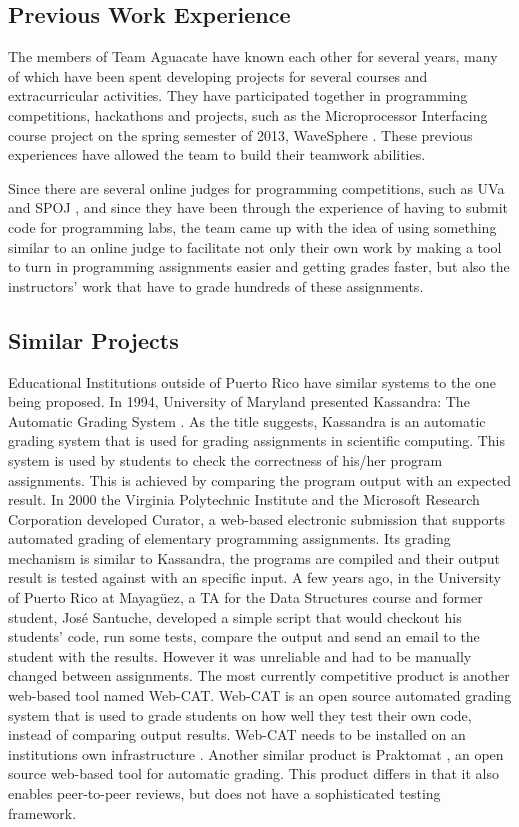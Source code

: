 
\subsection{Previous Work Experience}

The members of Team Aguacate have known each other for several years, many of
which have been spent developing projects for several courses and
extracurricular activities. They have participated together in programming
competitions, hackathons and projects, such as the Microprocessor Interfacing
course project on the spring semester of 2013, WaveSphere \cite{Micro2}. These
previous experiences have allowed the team to build their teamwork abilities.

Since there are several online judges for programming competitions, such as UVa
\cite{UVA} and SPOJ \cite{SPOJ}, and since they have been through the experience
of having to submit code for programming labs, the team came up with the idea of
using something similar to an online judge to facilitate not only their own work
by making a tool to turn in programming assignments easier and getting grades
faster, but also the instructors' work that have to grade hundreds of these
assignments.

\subsection{Similar Projects}

Educational Institutions outside of Puerto Rico have similar systems to the one
being proposed. In 1994, University of Maryland presented Kassandra: The
Automatic Grading System \cite{Matt1994}. As the title suggests, Kassandra is an
automatic grading system that is used for grading assignments in scientific
computing. This system is used by students to check the correctness of his/her
program assignments. This is achieved by comparing the program output with an
expected result. In 2000 the Virginia Polytechnic Institute and the Microsoft
Research Corporation developed Curator, a web-based electronic submission that
supports automated grading of elementary programming assignments. \cite{Curator}
Its grading mechanism is similar to Kassandra, the programs are compiled and
their output result is tested against with an specific input. A few years ago,
in the University of Puerto Rico at Mayagüez, a TA for the Data Structures
course and former student, José Santuche, developed a simple script that would
checkout his students' code, run some tests, compare the output and send an
email to the student with the results. However it was unreliable and had to be
manually changed between assignments. The most currently competitive product is
another web-based tool named Web-CAT. Web-CAT is an open source automated
grading system that is used to grade students on how well they test their own
code, instead of comparing output results. Web-CAT needs to be installed on an
institutions own infrastructure \cite{WebCat}. Another similar product is
Praktomat \cite{Praktomat}, an open source web-based tool for automatic grading.
This product differs in that it also enables peer-to-peer reviews, but does not
have a sophisticated testing framework.

